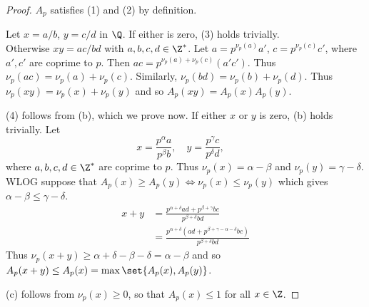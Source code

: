 \documentclass[12pt]{article}
\begin{document}
\begin{proof}
    $A_p$ satisfies (1) and (2) by definition.

    Let $x = a/b$, $y = c/d$ in $\Q$.
    If either is zero, (3) holds trivially. \\
    Otherwise $xy = ac/bd$ with $a, b, c, d \in \Z^*$.
    Let $a = p^{\nu_p(a)} a'$, $c = p^{\nu_p(c)} c'$, where $a', c'$ are
    coprime to $p$.
    Then $ac = p^{\nu_p(a) + \nu_p(c)} (a'c')$.
    Thus $\nu_p(ac) = \nu_p(a) + \nu_p(c)$.
    Similarly, $\nu_p(bd) = \nu_p(b) + \nu_p(d)$.
    Thus $\nu_p(xy) = \nu_p(x) + \nu_p(y)$ and so
    $A_p(xy) = A_p(x) A_p(y)$.

    (4) follows from (b), which we prove now.
    If either $x$ or $y$ is zero, (b) holds trivially.
    Let \[
        x = \frac{p^\alpha a}{p^\beta b}, \quad
        y = \frac{p^\gamma c}{p^\delta d}, \quad
    \] where $a, b, c, d \in \Z^*$ are coprime to $p$.
    Thus $\nu_p(x) = \alpha - \beta$ and $\nu_p(y) = \gamma - \delta$.
    WLOG suppose that $A_p(x) \ge A_p(y) \iff \nu_p(x) \le \nu_p(y)$
    which gives $\alpha - \beta \le \gamma - \delta$.
    \begin{align*}
        x + y &= \frac{p^{\alpha + \delta} ad
                    + p^{\beta + \gamma} bc}{p^{\beta + \delta} bd} \\
        &= \frac{p^{\alpha + \delta}
                (ad + p^{\beta + \gamma - \alpha - \delta} bc)}
            {p^{\beta + \delta} bd}
    \end{align*}
    Thus $\nu_p(x + y) \ge \alpha + \delta - \beta - \delta
                   = \alpha - \beta$ and so
    $A_p(x + y) \le A_p(x) = \max\set{A_p(x), A_p(y)}$.

    (c) follows from $\nu_p(x) \ge 0$, so that $A_p(x) \le 1$
    for all $x \in \Z$.
\end{proof}
\end{document}
